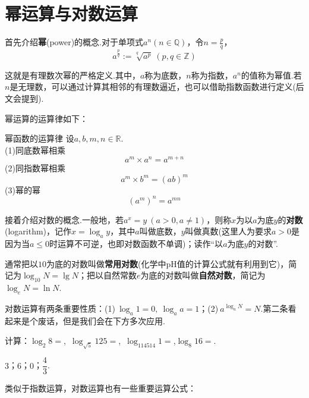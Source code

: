\documentclass[lang=cn, zihao=5]{elegantbook}
\newcommand{\R}{\mathbb{R}}
\newcommand{\tk}{\uline{\hspace{4em}}}
\begin{document}
\section{幂运算与对数运算}

首先介绍\textbf{幂}(power)的概念.对于单项式$a^n(n \in \mathbb{Q})$，令$n=\frac{p}{q}$，
$$a^{\frac{p}{q}}:=\sqrt[q]{a^p} \ (p,q \in \mathbb{Z})$$

这就是有理数次幂的严格定义.其中，$a$称为底数，$n$称为指数，$a^n$的值称为幂值.若$n$是无理数，可以通过计算其相邻的有理数逼近，也可以借助指数函数进行定义(后文会提到).

幂运算的运算律如下：

\begin{proposition}{幂函数的运算律}
	设$a,b,m,n \in \R $. \\
	(1)同底数幂相乘$$a^m \times a^n = a^{m+n}$$
	(2)同指数幂相乘$$a^m \times b^m = (ab)^m$$
	(3)幂的幂$$(a^m)^n=a^{mn}$$
\end{proposition}

接着介绍对数的概念.一般地，若$a^x=y~(a>0,a \neq 1)$，则称$x$为以$a$为底$y$的\textbf{对数}(logarithm)，记作$x = \log_{a}{y}$，其中$a$叫做底数，$y$叫做真数(这里人为要求$a>0$是因为当$a\leq 0$时运算不可逆，也即对数函数不单调)；读作“以$a$为底$y$的对数”.

通常把以$10$为底的对数叫做\textbf{常用对数}(化学中pH值的计算公式就有利用到它)，简记为$\log_{10}{N}=\lg N$；把以自然常数$e$为底的对数叫做\textbf{自然对数}，简记为$\log_{e}{N}=\ln N$.

对数运算有两条重要性质：(1)$~\log_{a}{1} = 0,~\log_{a}{a}=1$；(2)$~a^{\log_{a}{N}}=N$.第二条看起来是个废话，但是我们会在下方多次应用.

\begin{example}
	计算：$\log_{2}{8}=$\tk ,~$\log_{\sqrt{5}}{125}=$\tk ,~$\log_{114514}{1}=$\tk ,$\log_{8}{16}=$\tk .
\end{example}
\begin{solution}
	$3$；$6$；$0$；$\dfrac{4}{3}$.
\end{solution}

类似于指数运算，对数运算也有一些重要运算公式：
\end{document}
